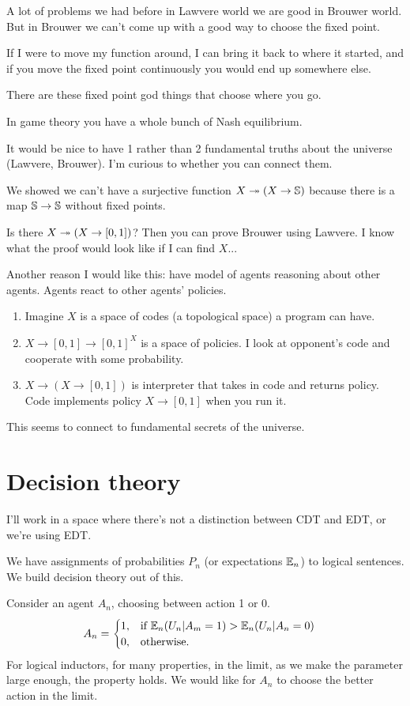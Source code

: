 \documentclass[11pt]{article}
\begin{document}
A lot of problems we had before in Lawvere world we are good in Brouwer world. But in Brouwer we can't come up with a good way to choose the fixed point.

If I were to move my function around, I can bring it back to where it started, and if you move the fixed point continuously you would end up somewhere else.

There are these fixed point god things that choose where you go.

In game theory you have a whole bunch of Nash equilibrium.

It would be nice to have 1 rather than 2 fundamental truths about the universe (Lawvere, Brouwer). I'm curious to whether you can connect them.

We showed we can't have a surjective function $X\twoheadrightarrow (X\to \mathbb{S})$ because there is a map $\mathbb{S}\to \mathbb{S}$ without fixed points.

Is there $X\twoheadrightarrow (X\to [0,1])$? Then you can prove Brouwer using Lawvere.  I know what the proof would look like if I can find $X$...

Another reason I would like this: have model of agents reasoning about other agents. Agents react to other agents' policies.
\begin{enumerate}
\item
Imagine $X$ is a space of codes (a topological space) a program can have.
\item
$X\to [0,1]\to [0,1]^X$ is a space of policies. I look at opponent's code and cooperate with some probability.
\item
 $X\to (X\to [0,1])$ is interpreter that takes in code and returns policy. %
 Code implements policy $X\to [0,1]$ when you run it.
\end{enumerate}

This seems to connect to fundamental secrets of the universe.

\section{Decision theory}

I'll work in a space where there's not a distinction between CDT and EDT, or we're using EDT.

We have assignments of probabilities $P_n$ (or expectations $\mathbb{E}_n$) to logical sentences. We build decision theory out of this. 

Consider an agent $A_n$, choosing between action 1 or 0. 
\begin{align}
A_n &= \begin{cases}
1,&\text{if }\mathbb{E}_n(U_n | A_m=1)> \mathbb{E}_n(U_n|A_n=0)\\
0,&\text{otherwise.}
\end{cases}
\end{align}
For logical inductors, for many properties, in the limit, as we make the parameter large enough, the property holds. We would like for $A_n$ to choose the better action in the limit.
\end{document}
